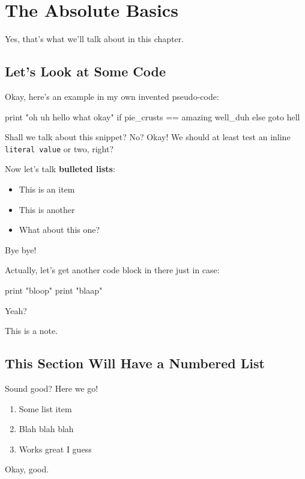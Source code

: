 \chapter{The Absolute Basics}

Yes, that's what we'll talk about in this chapter.

\section{Let's Look at Some Code}

Okay, here's an example in my own invented pseudo-code:

\begin{Code}
print "oh uh hello what okay"
if pie_crusts == amazing
    well_duh
else
    goto hell
\end{Code}

Shall we talk about this snippet? No? Okay! We should at least test an
inline \verb!literal value! or two, right?

Now let's talk \textbf{bulleted lists}:

\begin{itemize}
\item
  This is an item
\item
  This is another
\item
  What about this one?
\end{itemize}
Bye bye!

Actually, let's get another code block in there just in case:

\begin{Code}
print "bloop"
print "blaap"
\end{Code}

Yeah?

\begin{note}
This is a note.
\end{note}

\section{This Section Will Have a Numbered List}

Sound good? Here we go!

\begin{enumerate}[1.]
\item
  Some list item
\item
  Blah blah blah
\item
  Works great I guess
\end{enumerate}
Okay, good.
